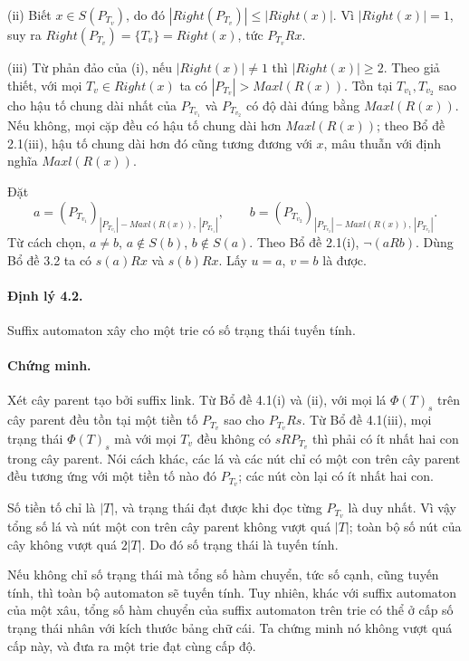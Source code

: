 \documentclass[11pt]{article}
\begin{document}
(ii) Biết \(x\in S(P_{T_v})\), do đó \(|Right(P_{T_v})|\le |Right(x)|\). Vì
\(|Right(x)|=1\), suy ra \(Right(P_{T_v})=\{T_v\}=Right(x)\), tức \(P_{T_v}Rx\).

(iii) Từ phản đảo của (i), nếu \(|Right(x)|\ne 1\) thì \(|Right(x)|\ge 2\).
Theo giả thiết, với mọi \(T_v\in Right(x)\) ta có
\(|P_{T_v}|>Maxl(R(x))\). Tồn tại \(T_{v_1},T_{v_2}\) sao cho hậu tố chung dài
nhất của \(P_{T_{v_1}}\) và \(P_{T_{v_2}}\) có độ dài đúng bằng \(Maxl(R(x))\).
Nếu không, mọi cặp đều có hậu tố chung dài hơn \(Maxl(R(x))\); theo Bổ đề
2.1(iii), hậu tố chung dài hơn đó cũng tương đương với \(x\), mâu thuẫn với
định nghĩa \(Maxl(R(x))\).

Đặt
\[
  a=(P_{T_{v_1}})_{|P_{T_{v_1}}|-Maxl(R(x)),\,|P_{T_{v_1}}|},\qquad
  b=(P_{T_{v_2}})_{|P_{T_{v_2}}|-Maxl(R(x)),\,|P_{T_{v_2}}|}.
\]
Từ cách chọn, \(a\ne b\), \(a\notin S(b)\), \(b\notin S(a)\). Theo Bổ đề 2.1(i),
\(\neg(aRb)\). Dùng Bổ đề 3.2 ta có \(s(a)Rx\) và \(s(b)Rx\). Lấy \(u=a\),
\(v=b\) là được.

\paragraph{Định lý 4.2.}
Suffix automaton xây cho một trie có số trạng thái tuyến tính.

\paragraph{Chứng minh.}
Xét cây parent tạo bởi suffix link. Từ Bổ đề 4.1(i) và (ii), với mọi lá
\(\Phi(T)_s\) trên cây parent đều tồn tại một tiền tố \(P_{T_v}\) sao cho
\(P_{T_v}Rs\). Từ Bổ đề 4.1(iii), mọi trạng thái \(\Phi(T)_s\) mà với mọi
\(T_v\) đều không có \(sRP_{T_v}\) thì phải có ít nhất hai con trong cây parent.
Nói cách khác, các lá và các nút chỉ có một con trên cây parent đều tương ứng
với một tiền tố nào đó \(P_{T_v}\); các nút còn lại có ít nhất hai con.

Số tiền tố chỉ là \(|T|\), và trạng thái đạt được khi đọc từng \(P_{T_v}\) là
duy nhất. Vì vậy tổng số lá và nút một con trên cây parent không vượt quá
\(|T|\); toàn bộ số nút của cây không vượt quá \(2|T|\). Do đó số trạng thái là
tuyến tính.

Nếu không chỉ số trạng thái mà tổng số hàm chuyển, tức số cạnh, cũng tuyến tính,
thì toàn bộ automaton sẽ tuyến tính. Tuy nhiên, khác với suffix automaton của
một xâu, tổng số hàm chuyển của suffix automaton trên trie có thể ở cấp số trạng
thái nhân với kích thước bảng chữ cái. Ta chứng minh nó không vượt quá cấp này,
và đưa ra một trie đạt cùng cấp độ.
\end{document}
